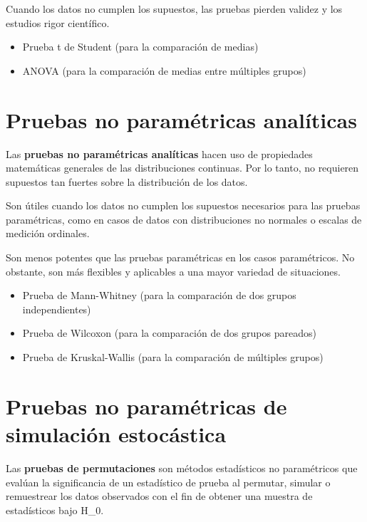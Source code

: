 \documentclass[
  letterpaper,
  DIV=11,
  numbers=noendperiod]{scrreprt}
\providecommand{\tightlist}{%
  \setlength{\itemsep}{0pt}\setlength{\parskip}{0pt}}\usepackage{longtable,booktabs,array}
\begin{document}
Cuando los datos no cumplen los supuestos, las pruebas pierden validez y
los estudios rigor científico.

\begin{itemize}
\tightlist
\item
  Prueba t de Student (para la comparación de medias)
\item
  ANOVA (para la comparación de medias entre múltiples grupos)
\end{itemize}

\section{Pruebas no paramétricas
analíticas}\label{pruebas-no-paramuxe9tricas-analuxedticas}

Las \textbf{pruebas no paramétricas analíticas} hacen uso de propiedades
matemáticas generales de las distribuciones continuas. Por lo tanto, no
requieren supuestos tan fuertes sobre la distribución de los datos.

Son útiles cuando los datos no cumplen los supuestos necesarios para las
pruebas paramétricas, como en casos de datos con distribuciones no
normales o escalas de medición ordinales.

Son menos potentes que las pruebas paramétricas en los casos
paramétricos. No obstante, son más flexibles y aplicables a una mayor
variedad de situaciones.

\begin{itemize}
\tightlist
\item
  Prueba de Mann-Whitney (para la comparación de dos grupos
  independientes)
\item
  Prueba de Wilcoxon (para la comparación de dos grupos pareados)
\item
  Prueba de Kruskal-Wallis (para la comparación de múltiples grupos)
\end{itemize}

\section{Pruebas no paramétricas de simulación
estocástica}\label{pruebas-no-paramuxe9tricas-de-simulaciuxf3n-estocuxe1stica}

Las \textbf{pruebas de permutaciones} son métodos estadísticos no
paramétricos que evalúan la significancia de un estadístico de prueba al
permutar, simular o remuestrear los datos observados con el fin de
obtener una muestra de estadísticos bajo H\_0.
\end{document}
